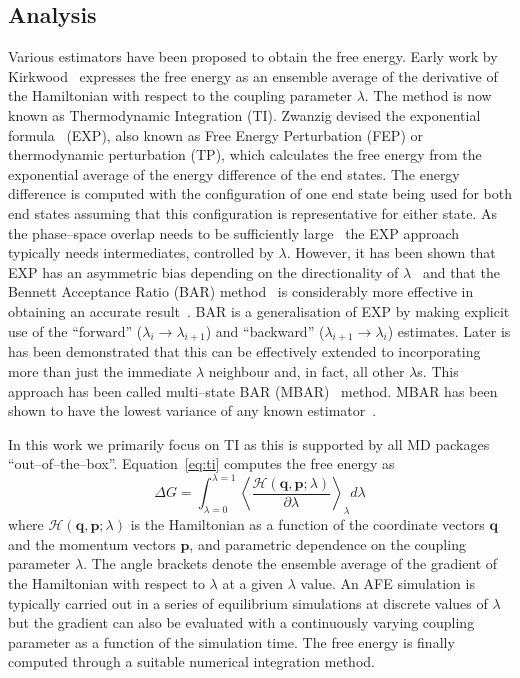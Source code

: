 \documentclass[journal=jctcce,manuscript=article]{achemso}
\renewcommand{\vec}[1]{\mathbf{#1}}
\begin{document}
\subsection{Analysis}
\label{sec:analysis}

Various estimators have been proposed to obtain the free energy.
Early work by Kirkwood~\cite{kirkwood_statistical_1935} expresses the
free energy as an ensemble average of the derivative of the
Hamiltonian with respect to the coupling parameter $\lambda$.  The
method is now known as Thermodynamic Integration (TI).  Zwanzig
devised the exponential formula~\cite{zwanzig_high-temperature_1954}
(EXP), also known as Free Energy Perturbation (FEP) or thermodynamic
perturbation (TP), which calculates the free energy from the
exponential average of the energy difference of the end states.  The
energy difference is computed with the configuration of one end state
being used for both end states assuming that this configuration is
representative for either state.  As the phase--space overlap needs to
be sufficiently large~\cite{wu_phase-space_2005,
  wu_phase-space_2005-1} the EXP approach typically needs
intermediates, controlled by $\lambda$.  However, it has been shown
that EXP has an asymmetric bias depending on the directionality of
$\lambda$~\cite{wu_asymmetric_2004} and that the Bennett Acceptance
Ratio (BAR) method~\cite{bennett_efficient_1976} is considerably more
effective in obtaining an accurate result~\cite{lu_appropriate_2003}.
BAR is a generalisation of EXP by making explicit use of the
``forward'' ($\lambda_i \rightarrow \lambda_{i+1}$) and ``backward''
($\lambda_{i+1} \rightarrow \lambda_i$) estimates.  Later is has been
demonstrated that this can be effectively extended to incorporating
more than just the immediate $\lambda$ neighbour and, in fact, all
other $\lambda$s.  This approach has been called multi--state BAR
(MBAR)~\cite{shirts_statistically_2008-1} method.  MBAR has been shown
to have the lowest variance of any known
estimator~\cite{shirts_statistically_2008}.

In this work we primarily focus on TI as this is supported by all MD
packages ``out--of--the--box''.  Equation~\ref{eq:ti} computes the free energy as
\begin{equation}\label{eq:ti}
	\Delta G = \int_{\lambda=0}^{\lambda=1}
	\left\langle \frac{\mathscr{H}(\vec{q},\vec{p};\lambda)}{\partial\lambda}\right\rangle_\lambda d\lambda
\end{equation}
where $\mathscr{H}(\vec{q},\vec{p};\lambda)$ is the Hamiltonian as a function of the coordinate vectors $\vec{q}$ and the momentum vectors $\vec{p}$, and parametric dependence on the coupling parameter $\lambda$.  The angle brackets denote the ensemble average of the gradient of the Hamiltonian with respect to $\lambda$ at a given $\lambda$ value.  An AFE simulation is typically carried out in a series of equilibrium simulations at discrete values of $\lambda$ but the gradient can also be evaluated with a continuously varying coupling parameter as a function of the simulation time.  The free energy is finally computed through a suitable numerical integration method.
\end{document}
